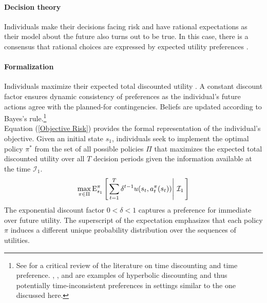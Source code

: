 \paragraph{Decision theory} Individuals make their decisions facing risk and have rational expectations \citep{Muth.1961,Lucas.1972} as their model about the future also turns out to be true. In this case, there is a consensus that rational choices are expressed by expected utility preferences \citep{Bernoulli.1738,Neumann.1944,Neumann.1947}.

\paragraph{Formalization} Individuals maximize their expected total discounted utility \citep{Samuelson.1937,Koopmans.1960}. A constant discount factor ensures dynamic consistency of preferences as the individual's future actions agree with the planned-for contingencies. Beliefs are updated according to Bayes's rule.\footnote{See \citet{Frederick.2002} for a critical review of the literature on time discounting and time preference. \citet{Fang.2009}, \citet{Fang.2015}, and \citet{Chan.2017} are examples of hyperbolic discounting and thus potentially time-inconsistent preferences in settings similar to the one discussed here.}\\

Equation (\ref{Objective Risk}) provides the formal representation of the individual's objective. Given an initial state $s_1$, individuals seek to implement the optimal policy $\pi^*$ from the set of all possible policies $\Pi$ that maximizes the expected total discounted utility over all $T$ decision periods given the information available at the time $\mathcal{I}_1$.
%
\begin{align}\label{Objective Risk}
\max_{\pi \in\Pi} \mathrm{E}_{s_1}^\pi\left[\left.\sum^{T}_{t = 1}  \delta^{t - 1} u(s_t, a^\pi_t(s_t)) \right\vert\,\mathcal{I}_1\,\right]
\end{align}
%
The exponential discount factor $0 < \delta < 1$ captures a preference for immediate over future utility. The superscript of the expectation emphasizes that each policy $\pi$ induces a different unique probability distribution over the sequences of utilities.

